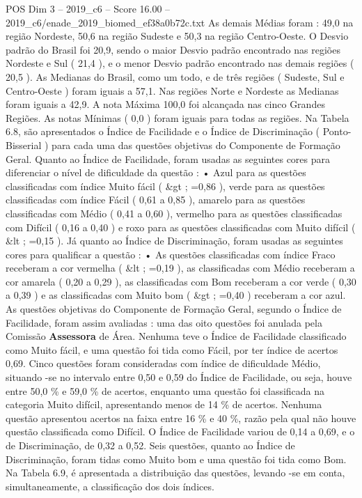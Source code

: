 \begin{textsample}{POS Dim 3 – 2019\_c6 – Score 16.00 – 2019\_c6/enade\_2019\_biomed\_ef38a0b72c.txt}
As demais Médias foram : 49,0 na região Nordeste, 50,6 na região Sudeste e 50,3 na região Centro-Oeste.
O Desvio padrão do Brasil foi 20,9, sendo o maior Desvio padrão encontrado nas regiões Nordeste e Sul ( 21,4 ), e o menor Desvio padrão encontrado nas demais regiões ( 20,5 ).
As Medianas do Brasil, como um todo, e de três regiões ( Sudeste, Sul e Centro-Oeste ) foram iguais a 57,1.
Nas regiões Norte e Nordeste as Medianas foram iguais a 42,9.
A nota Máxima 100,0 foi alcançada nas cinco Grandes Regiões.
As notas Mínimas ( 0,0 ) foram iguais para todas as regiões.
Na Tabela 6.8, são apresentados o Índice de Facilidade e o Índice de Discriminação ( Ponto-Bisserial ) para cada uma das questões objetivas do Componente de Formação Geral.
Quanto ao Índice de Facilidade, foram usadas as seguintes cores para diferenciar o nível de dificuldade da questão : • Azul para as questões classificadas com índice Muito fácil ( \&gt ; =0,86 ), verde para as questões classificadas com índice Fácil ( 0,61 a 0,85 ), amarelo para as questões classificadas com Médio ( 0,41 a 0,60 ), vermelho para as questões classificadas com Difícil ( 0,16 a 0,40 ) e roxo para as questões classificadas com Muito difícil ( \&lt ; =0,15 ).
Já quanto ao Índice de Discriminação, foram usadas as seguintes cores para qualificar a questão : • As questões classificadas com índice Fraco receberam a cor vermelha ( \&lt ; =0,19 ), as classificadas com Médio receberam a cor amarela ( 0,20 a 0,29 ), as classificadas com Bom receberam a cor verde ( 0,30 a 0,39 ) e as classificadas com Muito bom ( \&gt ; =0,40 ) receberam a cor azul.
As questões objetivas do Componente de Formação Geral, segundo o Índice de Facilidade, foram assim avaliadas : uma das oito questões foi anulada pela Comissão \textbf{Assessora} de Área.
Nenhuma teve o Índice de Facilidade classificado como Muito fácil, e uma questão foi tida como Fácil, por ter índice de acertos 0,69.
Cinco questões foram consideradas com índice de dificuldade Médio, situando -se no intervalo entre 0,50 e 0,59 do Índice de Facilidade, ou seja, houve entre 50,0 \% e 59,0 \% de acertos, enquanto uma questão foi classificada na categoria Muito difícil, apresentando menos de 14 \% de acertos.
Nenhuma questão apresentou acertos na faixa entre 16 \% e 40 \%, razão pela qual não houve questão classificada como Difícil.
O Índice de Facilidade variou de 0,14 a 0,69, e o de Discriminação, de 0,32 a 0,52.
Seis questões, quanto ao Índice de Discriminação, foram tidas como Muito bom e uma questão foi tida como Bom.
Na Tabela 6.9, é apresentada a distribuição das questões, levando -se em conta, simultaneamente, a classificação dos dois índices.

\end{textsample}
